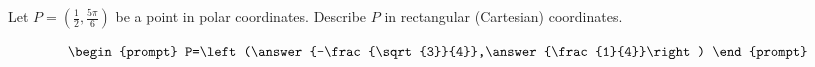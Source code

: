 \documentclass{ximera}
\author{Gregory Hartman \and Matthew Carr}
\begin{document}
\begin{exercise}





Let $P=(\frac{1}{2},\frac{5\pi}{6})$ be a point in polar coordinates. Describe $P$ in rectangular (Cartesian) coordinates.

\[
\begin{prompt}
P=\left(\answer{-\frac{\sqrt{3}}{4}},\answer{\frac{1}{4}}\right)
\end{prompt}
\]

\end{exercise}
\end{document}
